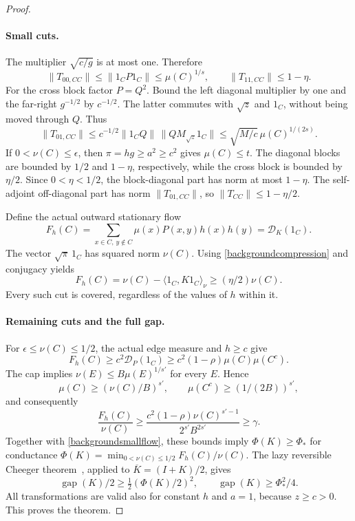 \begin{proof}
\paragraph{Small cuts.}
The multiplier $\sqrt{c/g}$ is at most one. Therefore
\[
 \|T_{00,CC}\|\leq\|1_CP1_C\|\leq\mu(C)^{1/s},
 \qquad\|T_{11,CC}\|\leq1-\eta.
\]
For the cross block factor $P=Q^2$. Bound the left diagonal multiplier
by one and the far-right $g^{-1/2}$ by $c^{-1/2}$. The latter commutes
with $\sqrt z$ and $1_C$, without being moved through $Q$. Thus
\[
 \|T_{01,CC}\|
 \leq c^{-1/2}\|1_CQ\|\,\|QM_{\sqrt z}1_C\|
 \leq\sqrt{M/c}\,\mu(C)^{1/(2s)}.
\]
If $0<\nu(C)\leq\epsilon$, then $\pi=hg\geq a^2\geq c^2$ gives
$\mu(C)\leq t$. The diagonal blocks are bounded by $1/2$ and
$1-\eta$, respectively, while the cross block is bounded by $\eta/2$.
Since $0<\eta<1/2$, the block-diagonal part has norm at most $1-\eta$.
The self-adjoint off-diagonal part has norm $\|T_{01,CC}\|$, so
$\|T_{CC}\|\leq1-\eta/2$.

Define the actual outward stationary flow
\[
 F_h(C)=\sum_{x\in C,\,y\notin C}\mu(x)P(x,y)h(x)h(y)
       =\mathcal D_K(1_C).
\]
The vector $\sqrt\pi\,1_C$ has squared norm $\nu(C)$.
Using \eqref{backgroundcompression} and conjugacy yields
\begin{equation}\label{backgroundsmallflow}
 F_h(C)=\nu(C)-\langle1_C,K1_C\rangle_\nu
       \geq(\eta/2)\nu(C).
\end{equation}
Every such cut is covered, regardless of the values of $h$ within it.

\paragraph{Remaining cuts and the full gap.}
For $\epsilon\leq\nu(C)\leq1/2$, the actual edge measure and $h\geq c$
give
\[
 F_h(C)\geq c^2\mathcal D_P(1_C)
       \geq c^2(1-\rho)\mu(C)\mu(C^c).
\]
The cap implies $\nu(E)\leq B\mu(E)^{1/s'}$ for every $E$. Hence
\[
 \mu(C)\geq(\nu(C)/B)^{s'},\qquad
 \mu(C^c)\geq(1/(2B))^{s'},
\]
and consequently
\[
 \frac{F_h(C)}{\nu(C)}
 \geq\frac{c^2(1-\rho)\nu(C)^{s'-1}}{2^{s'}B^{2s'}}\geq\gamma.
\]
Together with \eqref{backgroundsmallflow}, these bounds imply
$\Phi(K)\geq\Phi_*$ for conductance
$\Phi(K)=\min_{0<\nu(C)\leq1/2}F_h(C)/\nu(C)$.
The lazy reversible Cheeger theorem~\cite{peres}, applied to
$\overline K=(I+K)/2$, gives
\[
 \operatorname{gap}(K)/2\geq\tfrac12(\Phi(K)/2)^2,
 \qquad\operatorname{gap}(K)\geq\Phi_*^2/4.
\]
All transformations are valid also for constant $h$ and $a=1$, because
$z\geq c>0$. This proves the theorem.
\end{proof}

